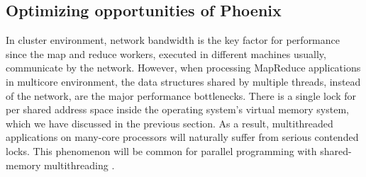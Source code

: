 



%




 
 




\subsection{Optimizing opportunities of Phoenix}
In cluster environment, network bandwidth is the key factor for performance since the map and reduce workers, executed in different machines usually, communicate by the network.
However, when processing MapReduce applications in multicore environment, the data structures shared by multiple threads, instead of the network, are the major performance bottlenecks.
There is a single lock for per shared address space inside the operating system’s virtual memory system, which we have discussed in the previous section. 
As a result, multithreaded applications on many-core processors will naturally suffer from serious contended locks.
This phenomenon will be common for parallel programming with shared-memory multithreading \cite{clements2013radixvm}.


